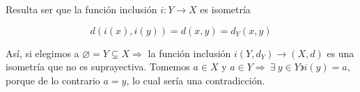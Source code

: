 \begin{remark}
    Resulta ser que la función inclusión $i : Y \to X$ es isometría

    \begin{equation*}
        d(i(x),i(y)) = d(x,y) = d_Y(x,y)
    \end{equation*}

    Así, si elegimos a $\varnothing = Y \subsetneq X \Rightarrow$ la función inclusión $i  (Y,d_Y) \to (X,d)$ es una isometría que no es suprayectiva. Tomemos $a \in X$ y $a \in Y \Rightarrow \: \exists \: y \in Y \backepsilon i(y) = a$, porque de lo contrario $a = y$, lo cual sería una contradicción. 
\end{remark}
